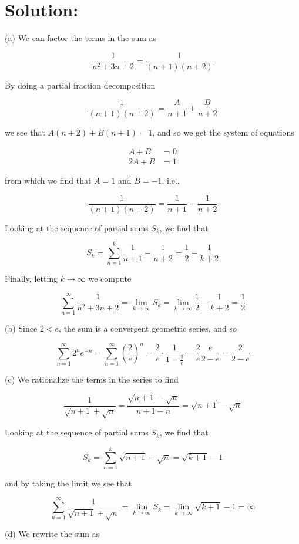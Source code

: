 \documentclass[10pt]{article}
\begin{document}
\section*{Solution:}
(a) We can factor the terms in the sum as

$$
\frac{1}{n^{2}+3 n+2}=\frac{1}{(n+1)(n+2)}
$$

By doing a partial fraction decomposition

$$
\frac{1}{(n+1)(n+2)}=\frac{A}{n+1}+\frac{B}{n+2}
$$

we see that $A(n+2)+B(n+1)=1$, and so we get the system of equations

$$
\begin{aligned}
A+B & =0 \\
2 A+B & =1
\end{aligned}
$$

from which we find that $A=1$ and $B=-1$, i.e.,

$$
\frac{1}{(n+1)(n+2)}=\frac{1}{n+1}-\frac{1}{n+2}
$$

Looking at the sequence of partial sums $S_{k}$, we find that

$$
S_{k}=\sum_{n=1}^{k} \frac{1}{n+1}-\frac{1}{n+2}=\frac{1}{2}-\frac{1}{k+2}
$$

Finally, letting $k \rightarrow \infty$ we compute

$$
\sum_{n=1}^{\infty} \frac{1}{n^{2}+3 n+2}=\lim _{k \rightarrow \infty} S_{k}=\lim _{k \rightarrow \infty} \frac{1}{2}-\frac{1}{k+2}=\frac{1}{2}
$$

(b) Since $2<e$, the sum is a convergent geometric series, and so

$$
\sum_{n=1}^{\infty} 2^{n} e^{-n}=\sum_{n=1}^{\infty}\left(\frac{2}{e}\right)^{n}=\frac{2}{e} \cdot \frac{1}{1-\frac{2}{e}}=\frac{2}{e} \frac{e}{2-e}=\frac{2}{2-e}
$$

(c) We rationalize the terms in the series to find

$$
\frac{1}{\sqrt{n+1}+\sqrt{n}}=\frac{\sqrt{n+1}-\sqrt{n}}{n+1-n}=\sqrt{n+1}-\sqrt{n}
$$

Looking at the sequence of partial sums $S_{k}$, we find that

$$
S_{k}=\sum_{n=1}^{k} \sqrt{n+1}-\sqrt{n}=\sqrt{k+1}-1
$$

and by taking the limit we see that

$$
\sum_{n=1}^{\infty} \frac{1}{\sqrt{n+1}+\sqrt{n}}=\lim _{k \rightarrow \infty} S_{k}=\lim _{k \rightarrow \infty} \sqrt{k+1}-1=\infty
$$

(d) We rewrite the sum as
\end{document}
